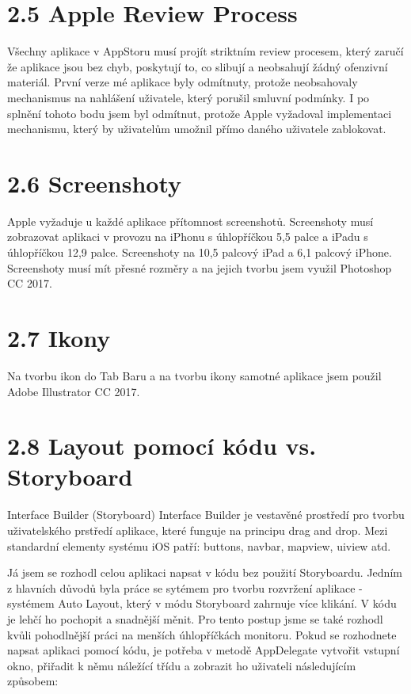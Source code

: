\documentclass{article}
\begin{document}
\vspace{10 mm}
\section*{2.5 Apple Review Process}
Všechny aplikace v AppStoru musí projít striktním review procesem, který zaručí že aplikace jsou bez chyb, poskytují to, co slibují a neobsahují žádný ofenzivní materiál. První verze mé aplikace byly odmítnuty, protože neobsahovaly mechanismus na nahlášení uživatele, který porušil smluvní podmínky. I po splnění tohoto bodu jsem byl odmítnut, protože Apple vyžadoval implementaci mechanismu, který by uživatelům umožnil přímo daného uživatele zablokovat. 

\vspace{10 mm}
\section*{2.6 Screenshoty}
Apple vyžaduje u každé aplikace přítomnost screenshotů. Screenshoty musí zobrazovat aplikaci v provozu na iPhonu s úhlopříčkou 5,5 palce a iPadu s úhlopříčkou 12,9 palce. Screenshoty na 10,5 palcový iPad a 6,1 palcový iPhone. Screenshoty musí mít přesné rozměry a na jejich tvorbu jsem využil Photoshop CC 2017.

\vspace{10 mm}

\section*{2.7 Ikony}

Na tvorbu ikon do Tab Baru a na tvorbu ikony samotné aplikace jsem použil Adobe Illustrator CC 2017. 
\vspace{10 mm}
        
\section*{2.8 Layout pomocí kódu vs. Storyboard}

Interface Builder (Storyboard)
Interface Builder je vestavěné prostředí pro tvorbu uživatelského prstředí aplikace, které funguje na principu drag and drop. Mezi standardní elementy systému iOS patří: buttons, navbar, mapview, uiview atd.
\vspace{10 mm}

Já jsem se rozhodl celou aplikaci napsat v kódu bez použití Storyboardu. 
Jedním z hlavních důvodů byla práce se sytémem pro tvorbu rozvržení aplikace - systémem Auto Layout, který v módu Storyboard zahrnuje více klikání. V kódu je lehčí ho pochopit a snadnější měnit. 
Pro tento postup jsme se také rozhodl kvůli pohodlnější práci na menších úhlopříčkách monitoru. Pokud se rozhodnete napsat aplikaci pomocí kódu, je potřeba v metodě AppDelegate vytvořit vstupní okno, přiřadit k němu náležící třídu a zobrazit ho uživateli následujícím způsobem:
\vspace{18 mm}
\end{document}
